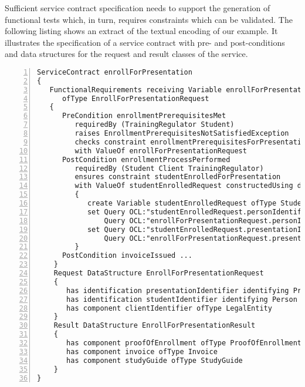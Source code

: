 Sufficient service contract specification needs to support the generation of functional tests which, in turn, requires constraints which can be validated. The following listing shows an extract of the textual encoding of our example. It illustrates the specification of a service contract with pre- and post-conditions and data structures for the request and result classes of the service.

\tiny \begin{lstlisting}[numbers=left,escapechar=|]
ServiceContract enrollForPresentation
{
   FunctionalRequirements receiving Variable enrollForPresentationRequest 
      ofType EnrollForPresentationRequest
   {
      PreCondition enrollmentPrerequisitesMet
         requiredBy (TrainingRegulator Student) 
         raises EnrollmentPrerequisitesNotSatisfiedException
         checks constraint enrollmentPrerequisitesForPresentationMet
         with ValueOf enrollForPresentationRequest
      PostCondition enrollmentProcessPerformed
         requiredBy (Student Client TrainingRegulator)
         ensures constraint studentEnrolledForPresentation 
         with ValueOf studentEnrolledRequest constructedUsing doSequential
         {
            create Variable studentEnrolledRequest ofType StudentEnrolledRequest
            set Query OCL:"studentEnrolledRequest.personIdentifier" equalTo
                Query OCL:"enrollForPresentationRequest.personIdentifier"                            
            set Query OCL:"studentEnrolledRequest.presentationIdentifier" equalTo
                Query OCL:"enrollForPresentationRequest.presentationIdentifier"                            
         }  
      PostCondition invoiceIssued ...
    }            
    Request DataStructure EnrollForPresentationRequest 
    {
       has identification presentationIdentifier identifying Presentation
       has identification studentIdentifier identifying Person
       has component clientIdentifier ofType LegalEntity         
    }
    Result DataStructure EnrollForPresentationResult 
    {
       has component proofOfEnrollment ofType ProofOfEnrollment
       has component invoice ofType Invoice
       has component studyGuide ofType StudyGuide
    }
}
\end{lstlisting}\normalsize

